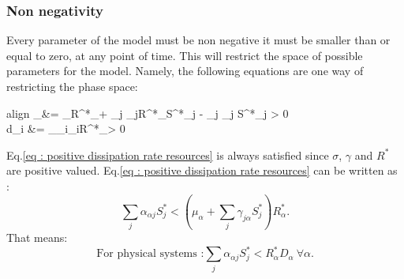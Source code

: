 \documentclass[12pt, titlepage]{report}
\begin{document}
			\subsubsection{Non negativity}
	Every parameter of the model must be non negative \ie it must be smaller than or equal to zero, at any point of time. This will restrict the space of possible parameters for the model. Namely, the following equations are one way of restricting the phase space:
	\begin{empheq}[left = \empheqlbrace]{align}
		\theta_\alpha &= \mu_\alpha R^*_\alpha + \sum_j \gamma_{j\alpha}R^*_\alpha S^*_j - \sum_j \alpha_{\alpha j} S^*_j > 0 \label{eq : positive feeding rates}\\
		d_i &= \sum_\beta \sigma_{i\beta}\gamma_{i\beta}R^*_\beta > 0 \label{eq : positive dissipation rate resources}
	\end{empheq}
	Eq.\eqref{eq : positive dissipation rate resources} is always satisfied since $\sigma$, $\gamma$ and $R^*$ are positive valued. Eq.\eqref{eq : positive dissipation rate resources} can be written as :
	\begin{equation}
		\sum_j \alpha_{\alpha j} S^*_j < \left(\mu_\alpha+\sum_j \gamma_{j\alpha}S^*_j\right)R^*_\alpha.
	\end{equation}
	That means:
	\begin{equation}
		\boxed{\text{For physical systems :} \sum_j \alpha_{\alpha j} S^*_j < R^*_\alpha D_\alpha \ \forall \alpha.}
	\end{equation}
\end{document}
